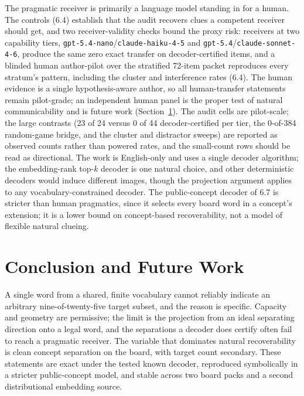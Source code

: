 \documentclass[11pt]{article}
\begin{document}
The pragmatic receiver is primarily a language model standing in for a human. The
controls (6.4) establish that the audit recovers clues a competent receiver should
get, and two receiver-validity checks bound the proxy risk: receivers at two
capability tiers, \texttt{gpt-5.4-nano}/\texttt{claude-haiku-4-5} and
\texttt{gpt-5.4}/\texttt{claude-sonnet-4-6}, produce the same zero exact transfer
on decoder-certified items, and a blinded human author-pilot over the stratified
72-item packet reproduces every stratum's pattern, including the cluster and
interference rates (6.4). The human evidence is a single hypothesis-aware author,
so all human-transfer statements remain pilot-grade; an independent human panel is
the proper test of natural communicability and is future work
(Section~\ref{sec:conclusion}). The audit cells are pilot-scale; the large
contrasts (23 of 24 versus 0 of 44 decoder-certified per tier, the 0-of-384
random-game bridge, and the cluster and distractor sweeps) are reported as
observed counts rather than powered rates, and the small-count rows should be read
as directional. The work is English-only and uses a single decoder algorithm; the
embedding-rank top-$k$ decoder is one natural choice, and other deterministic
decoders would induce different images, though the projection argument applies to
any vocabulary-constrained decoder. The public-concept decoder of 6.7 is stricter
than human pragmatics, since it selects every board word in a concept's extension;
it is a lower bound on concept-based recoverability, not a model of flexible
natural clueing.

\section{Conclusion and Future Work}\label{sec:conclusion}

A single word from a shared, finite vocabulary cannot reliably indicate an
arbitrary nine-of-twenty-five target subset, and the reason is specific. Capacity
and geometry are permissive; the limit is the projection from an
ideal separating direction onto a legal word, and the separations a decoder does
certify often fail to reach a pragmatic receiver. The variable that dominates
natural recoverability is clean concept separation on the board, with target count
secondary. These statements are exact under the tested known decoder, reproduced
symbolically in a stricter public-concept model, and stable across two board packs
and a second distributional embedding source.
\end{document}

